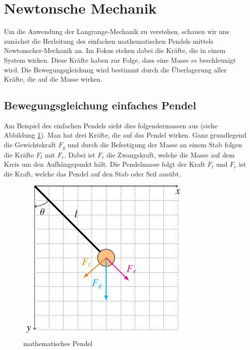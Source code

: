 \section{Newtonsche Mechanik}
Um die Anwendung der Langrange-Mechanik zu verstehen, schauen wir uns zunächst
die Herleitung des einfachen mathematischen Pendels mittels Newtonscher-Mechanik an.
Im Fokus stehen dabei die Kräfte, die in einem System wirken.
Diese Kräfte haben zur Folge, dass eine Masse \(m\) beschleunigt wird.
Die Bewegungsgleichung wird bestimmt durch die Überlagerung aller Kräfte, die auf
die Masse wirken.

\subsection{Bewegungsgleichung einfaches Pendel}
Am Beispiel des einfachen Pendels sieht dies folgendermassen aus
(siehe Abbildung \ref{fig:pendulum1}).
Man hat drei Kräfte, die auf das Pendel wirken.
Ganz grundlegend die Gewichtskraft \(F_g\) und durch die Befestigung der Masse
an einem Stab folgen die Kräfte \(F_t\) mit \(F_r\).
Dabei ist \(F_r\) die Zwangskraft, welche die Masse auf dem Kreis um
den Aufhängepunkt hält.
Die Pendelmasse folgt der Kraft \(F_t\) und \(F_r\) ist die Kraft, welche
das Pendel auf den Stab oder Seil ausübt.

\begin{figure}
    \centering
    \includegraphics{papers/doppelpendel/images/pendel_pic1.pdf}
    \caption{mathematisches Pendel}
    \label{fig:pendulum1}
\end{figure}

